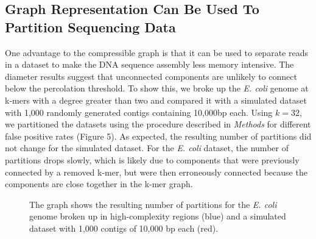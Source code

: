 \documentclass[12pt]{article} \usepackage{simplemargins}
\begin{document}
\subsection{Graph Representation Can Be Used To Partition Sequencing Data}
One advantage to the compressible graph is that it can be used to 
separate reads in a dataset to make the DNA sequence assembly less 
memory intensive. The diameter results suggest that unconnected components 
are unlikely to connect below the percolation threshold. To show this, we broke up the  
\emph{E. coli} genome at k-mers with a degree greater than two and compared it 
with a simulated dataset with 1,000 randomly generated contigs containing 
10,000bp each. Using 
$k=32$, we partitioned the datasets using the procedure described in 
\emph{Methods} for different false positive rates (Figure 5). As expected, the 
resulting number of partitions did not change for the simulated dataset. For the 
\emph{E. coli} dataset, the number of partitions drops slowly, which is likely 
due to components that were previously connected by a removed k-mer, but were 
then erroneously connected because the components are close together in the 
k-mer graph.

\begin{figure}
\caption{The graph shows the resulting number of partitions for the 
\emph{E. coli} genome broken up in high-complexity regions (blue) and 
a simulated dataset with 1,000 contigs of 10,000 bp each (red).}
\end{figure}
\end{document}
